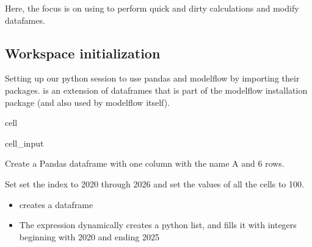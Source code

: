\documentclass[letterpaper,10pt,english]{jupyterBook}
\begin{document}
\sphinxAtStartPar
Here, the focus is on using to perform quick and dirty calculations and modify datafames.


\subsection{Workspace initialization}
\label{\detokenize{content/04_PythonEssentials/mfcalc:workspace-initialization}}
\sphinxAtStartPar
Setting up our python session to use pandas and modelflow by importing their packages.   is an extension of dataframes that is part of the modelflow installation package (and also used by modelflow itself).

\begin{sphinxuseclass}{cell}\begin{sphinxVerbatimInput}

\begin{sphinxuseclass}{cell_input}
\begin{sphinxVerbatim}[commandchars=\\\{\}]
     
        
\end{sphinxVerbatim}

\end{sphinxuseclass}\end{sphinxVerbatimInput}

\end{sphinxuseclass}
\sphinxAtStartPar
{}

\sphinxAtStartPar
Create a Pandas dataframe with one column with the name A and 6 rows.

\sphinxAtStartPar
Set set the index to 2020 through 2026 and set the values of all the cells to 100.
\begin{itemize}
\item {} 
\sphinxAtStartPar
{} creates a dataframe  

\item {} 
\sphinxAtStartPar
The expression  dynamically creates a  python list, and fills it with  integers beginning with 2020 and ending 2025

\end{itemize}
\end{document}
